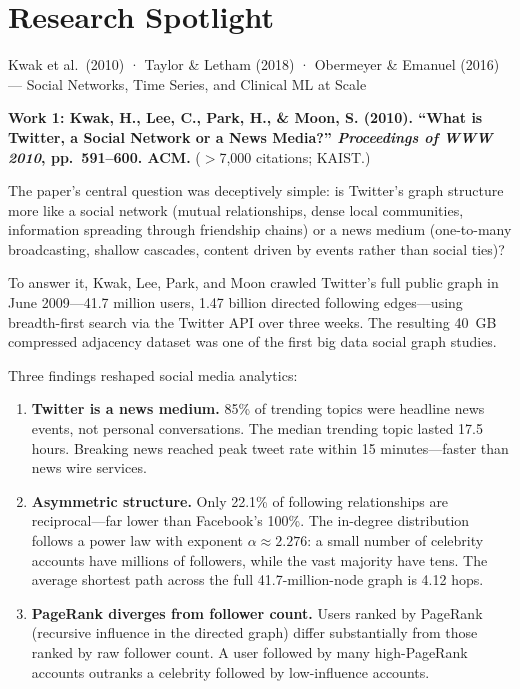 \section{Research Spotlight}
\label{sec:ch10-research}

\begin{researchspotlight}{Kwak et al.\ (2010) · Taylor \& Letham (2018)
  · Obermeyer \& Emanuel (2016) --- Social Networks, Time Series, and
  Clinical ML at Scale}

\textbf{Work 1: Kwak, H., Lee, C., Park, H., \& Moon, S. (2010).
``What is Twitter, a Social Network or a News Media?''
\textit{Proceedings of WWW 2010}, pp.~591--600. ACM.}
($>$7{,}000 citations; KAIST.)

The paper's central question was deceptively simple: is Twitter's graph
structure more like a social network (mutual relationships, dense local
communities, information spreading through friendship chains) or a news
medium (one-to-many broadcasting, shallow cascades, content driven by
events rather than social ties)?

To answer it, Kwak, Lee, Park, and Moon crawled Twitter's full public
graph in June 2009---41.7 million users, 1.47 billion directed following
edges---using breadth-first search via the Twitter API over three weeks.
The resulting 40~GB compressed adjacency dataset was one of the first
big data social graph studies.

Three findings reshaped social media analytics:
\begin{enumerate}
  \item \textbf{Twitter is a news medium.} 85\% of trending topics were
        headline news events, not personal conversations. The median trending
        topic lasted 17.5 hours. Breaking news reached peak tweet rate
        within 15 minutes---faster than news wire services.
  \item \textbf{Asymmetric structure.} Only 22.1\% of following
        relationships are reciprocal---far lower than Facebook's 100\%.
        The in-degree distribution follows a power law with exponent
        $\alpha \approx 2.276$: a small number of celebrity accounts
        have millions of followers, while the vast majority have tens.
        The average shortest path across the full 41.7-million-node
        graph is 4.12 hops.
  \item \textbf{PageRank diverges from follower count.} Users ranked by
        PageRank (recursive influence in the directed graph) differ
        substantially from those ranked by raw follower count.
        A user followed by many high-PageRank accounts outranks a
        celebrity followed by low-influence accounts.
\end{enumerate}


\end{researchspotlight}
